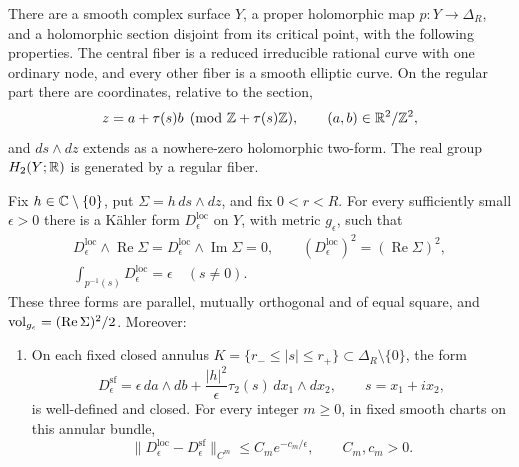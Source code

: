 \begin{theorem}\label{thm:nodal-model}
There are a smooth complex surface \(Y\), a proper holomorphic map
\(p:Y\to\Delta_R\), and a holomorphic section disjoint from its critical
point, with the following properties.  The central fiber is a reduced
irreducible rational curve with one ordinary node, and every other
fiber is a smooth elliptic curve.  On the regular part there are
coordinates, relative to the section,
\begin{equation}\label{eq:nodal-elliptic-coordinates}
 z=a+\tau(s)b\pmod{\mathbb Z+\tau(s)\mathbb Z},\qquad
 (a,b)\in\mathbb R^2/\mathbb Z^2,
\end{equation}
and \(ds\wedge dz\) extends as a nowhere-zero holomorphic two-form.
The real group \(H_2(Y;\mathbb R)\) is generated by a regular fiber.

Fix \(h\in\mathbb C\setminus\{0\}\), put \(\Sigma=h\,ds\wedge dz\), and fix
\(0<r<R\).  For every sufficiently small \(\epsilon>0\) there is a
K\"ahler form \(D^{\mathrm{loc}}_\epsilon\) on \(Y\), with metric
\(g_\epsilon\), such that
\begin{equation}\label{eq:nodal-exact-identities}
 \begin{gathered}
 D^{\mathrm{loc}}_\epsilon\wedge\operatorname{Re}\Sigma
 =D^{\mathrm{loc}}_\epsilon\wedge\operatorname{Im}\Sigma=0,\qquad
 (D^{\mathrm{loc}}_\epsilon)^2=(\operatorname{Re}\Sigma)^2,\\
 \int_{p^{-1}(s)}D^{\mathrm{loc}}_\epsilon=\epsilon\quad(s\ne0).
 \end{gathered}
\end{equation}
These three forms are parallel, mutually orthogonal and of equal
square, and \(\operatorname{vol}_{g_\epsilon}=(\operatorname{Re}\Sigma)^2/2\).
Moreover:
\begin{enumerate}[label=\textup{(\roman*)}]
\item On each fixed closed annulus
\(K=\{r_-\le |s|\le r_+\}\subset\Delta_R\setminus\{0\}\), the form
\begin{equation}\label{eq:nodal-semiflat}
 D^{\mathrm{sf}}_\epsilon
   =\epsilon\,da\wedge db+
      \frac{|h|^2}{\epsilon}\tau_2(s)\,dx_1\wedge dx_2,
       \qquad s=x_1+ix_2,
\end{equation}
is well-defined and closed.  For every integer \(m\ge0\), in fixed
smooth charts on this annular bundle,
\begin{equation}\label{eq:nodal-exponential-estimate}
 \|D^{\mathrm{loc}}_\epsilon-D^{\mathrm{sf}}_\epsilon\|_{C^m}
       \le C_m e^{-c_m/\epsilon},
       \qquad C_m,c_m>0.
\end{equation}

\end{enumerate}
\end{theorem}
